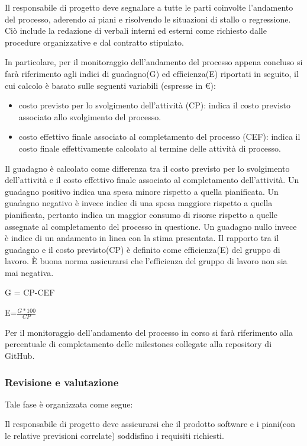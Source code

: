 \myparagraph{}
Il responsabile di progetto deve segnalare a tutte le parti coinvolte l'andamento del processo, aderendo ai piani e risolvendo le situazioni di stallo o regressione. Ciò include la redazione di verbali interni ed esterni come richiesto dalle procedure organizzative e dal contratto stipulato.

In particolare, per il monitoraggio dell'andamento del processo appena concluso si farà riferimento agli indici di guadagno(G) ed efficienza(E) riportati in seguito, il cui calcolo è basato sulle seguenti variabili (espresse in €):
\begin{itemize}
    \item costo previsto per lo svolgimento dell'attività (CP): indica il costo previsto associato allo svolgimento del processo.
    \item costo effettivo finale associato al completamento del processo (CEF): indica il costo finale effettivamente calcolato al termine delle attività di processo.
\end{itemize}
Il guadagno è calcolato come differenza tra il costo previsto per lo svolgimento dell'attività e il costo effettivo finale associato al completamento dell'attività. Un guadagno positivo indica una spesa minore rispetto a quella pianificata. Un guadagno negativo è invece indice di una spesa maggiore rispetto a quella pianificata, pertanto indica un maggior consumo di risorse rispetto a quelle assegnate al completamento del processo in questione. Un guadagno nullo invece è indice di un andamento in linea con la stima presentata. Il rapporto tra il guadagno e il costo previsto(CP) è definito come efficienza(E) del gruppo di lavoro. \`E buona norma assicurarsi che l'efficienza del gruppo di lavoro non sia mai negativa.

G = CP-CEF

E=$\frac{G*100}{CP}$

Per il monitoraggio dell'andamento del processo in corso si farà riferimento alla percentuale di completamento delle  milestones collegate alla repository di GitHub.

\subsubsection{Revisione e valutazione}
Tale fase è organizzata come segue:

\myparagraph{}
Il responsabile di progetto deve assicurarsi che il prodotto software e i piani(con le relative previsioni correlate) soddisfino i requisiti richiesti.

